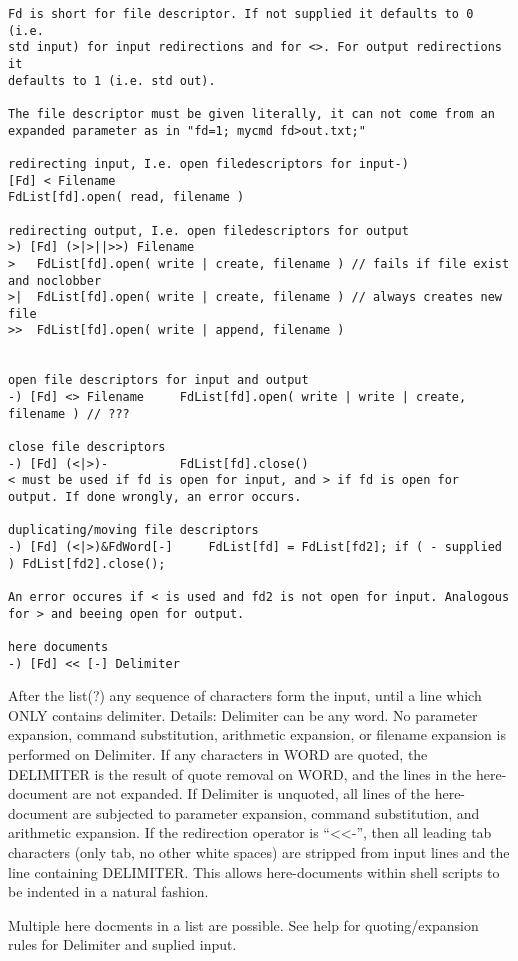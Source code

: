 \documentclass{article}
\begin{document}
\begin{verbatim}
Fd is short for file descriptor. If not supplied it defaults to 0 (i.e.
std input) for input redirections and for <>. For output redirections it
defaults to 1 (i.e. std out).

The file descriptor must be given literally, it can not come from an
expanded parameter as in "fd=1; mycmd fd>out.txt;"

redirecting input, I.e. open filedescriptors for input-)
[Fd] < Filename
FdList[fd].open( read, filename )

redirecting output, I.e. open filedescriptors for output
>) [Fd] (>|>||>>) Filename			
>	FdList[fd].open( write | create, filename ) // fails if file exist and noclobber
>|	FdList[fd].open( write | create, filename ) // always creates new file
>>	FdList[fd].open( write | append, filename )


open file descriptors for input and output
-) [Fd] <> Filename		FdList[fd].open( write | write | create, filename ) // ???

close file descriptors
-) [Fd] (<|>)-			FdList[fd].close()
< must be used if fd is open for input, and > if fd is open for output. If done wrongly, an error occurs.

duplicating/moving file descriptors
-) [Fd] (<|>)&FdWord[-]		FdList[fd] = FdList[fd2]; if ( - supplied ) FdList[fd2].close(); 	

An error occures if < is used and fd2 is not open for input. Analogous
for > and beeing open for output.

here documents
-) [Fd] << [-] Delimiter 	
\end{verbatim}

After the list(?) any sequence of characters form the input, until a
line which ONLY contains delimiter. Details: Delimiter can be any word.
No parameter expansion, command substitution, arithmetic expansion, or
filename expansion is performed on Delimiter. If any characters in WORD
are quoted, the DELIMITER is the result of quote removal on WORD, and
the lines in the here-document are not expanded. If Delimiter is
unquoted, all lines of the here-document are subjected to parameter
expansion, command substitution, and arithmetic expansion. If the
redirection operator is ``<<-'', then all leading tab characters (only
tab, no other white spaces) are stripped from input lines and the line
containing DELIMITER. This allows here-documents within shell scripts to
be indented in a natural fashion.

Multiple here docments in a list are possible. See help for
quoting/expansion rules for Delimiter and suplied input.
\end{document}
